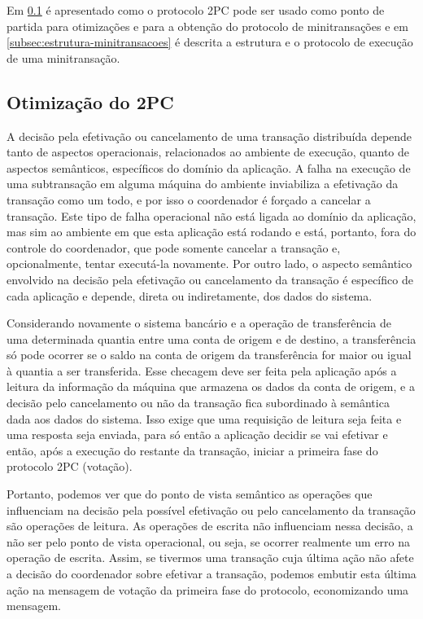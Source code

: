 \documentclass[11pt,twoside,a4paper]{book}
\begin{document}
Em \ref{subsec:derivando-minitransacoes} é apresentado como o protocolo 2PC pode ser usado como ponto de partida para otimizações e para a obtenção do protocolo de minitransações e em \ref{subsec:estrutura-minitransacoes} é descrita a estrutura e o protocolo de execução de uma minitransação.

\subsection{Otimização do 2PC}
\label{subsec:derivando-minitransacoes}
A decisão pela efetivação ou cancelamento de uma transação distribuída depende tanto de aspectos operacionais, relacionados ao ambiente de execução, quanto de aspectos semânticos, específicos do domínio da aplicação. A falha na execução de uma subtransação em alguma máquina do ambiente inviabiliza a efetivação da transação como um todo, e por isso o coordenador é forçado a cancelar a transação. Este tipo de falha operacional não está ligada ao domínio da aplicação, mas sim ao ambiente em que esta aplicação está rodando e está, portanto, fora do controle do coordenador, que pode somente cancelar a transação e, opcionalmente, tentar executá-la novamente. Por outro lado, o aspecto semântico envolvido na decisão pela efetivação ou cancelamento da transação é específico de cada aplicação e depende, direta ou indiretamente, dos dados do sistema.

Considerando novamente o sistema bancário e a operação de transferência de uma determinada quantia entre uma conta de origem e de destino, a transferência só pode ocorrer se o saldo na conta de origem da transferência for maior ou igual à quantia a ser transferida. Esse checagem deve ser feita pela aplicação após a leitura da informação da máquina que armazena os dados da conta de origem, e a decisão pelo cancelamento ou não da transação fica subordinado à semântica dada aos dados do sistema. Isso exige que uma requisição de leitura seja feita e uma resposta seja enviada, para só então a aplicação decidir se vai efetivar e então, após a execução do restante da transação, iniciar a primeira fase do protocolo 2PC (votação).

Portanto, podemos ver que do ponto de vista semântico as operações que influenciam na decisão pela possível efetivação ou pelo cancelamento da transação são operações de leitura. As operações de escrita não influenciam nessa decisão, a não ser pelo ponto de vista operacional, ou seja, se ocorrer realmente um erro na operação de escrita. Assim, se tivermos uma transação cuja última ação não afete a decisão do coordenador sobre efetivar a transação, podemos embutir esta última ação na mensagem de votação da primeira fase do protocolo, economizando uma mensagem.
\end{document}
